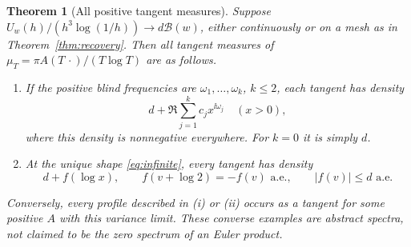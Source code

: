 \documentclass[11pt]{article}
\newtheorem{theorem}{Theorem}[section]
\theoremstyle{definition}\newtheorem{definition}[theorem]{Definition}
\theoremstyle{remark}\newtheorem{remark}[theorem]{Remark}
\newcommand{\B}{\mathcal B}
\newcommand{\tauh}{h^3\log(1/h)}
\begin{document}
\begin{theorem}[All positive tangent measures]\label{thm:tangents}
Suppose $U_w(h)/(\tauh)\to d\B(w)$, either continuously or on a mesh
as in Theorem~\ref{thm:recovery}. Then all tangent measures of
$\mu_T=\pi A(T\,\cdot)/(T\log T)$ are as follows.
\begin{enumerate}[label=\textup{(\roman*)}]
\item If the positive blind frequencies are $\omega_1,\ldots,\omega_k$,
$k\le2$, each tangent has density
\begin{equation}\label{eq:finite-tangent}
 d+\Re\sum_{j=1}^k c_jx^{\ii\omega_j}\quad(x>0),
\end{equation}
where this density is nonnegative everywhere. For $k=0$ it is simply $d$.
\item At the unique shape \eqref{eq:infinite}, every tangent has density
\begin{equation}\label{eq:infinite-tangent}
 d+f(\log x),\qquad
 f(v+\log2)=-f(v)\text{ a.e.},\qquad |f(v)|\le d\text{ a.e.}
\end{equation}
\end{enumerate}
Conversely, every profile described in (i) or (ii) occurs as a tangent for
some positive $A$ with this variance limit. These converse examples are
abstract spectra, not claimed to be the zero spectrum of an Euler product.
\end{theorem}
\end{document}
